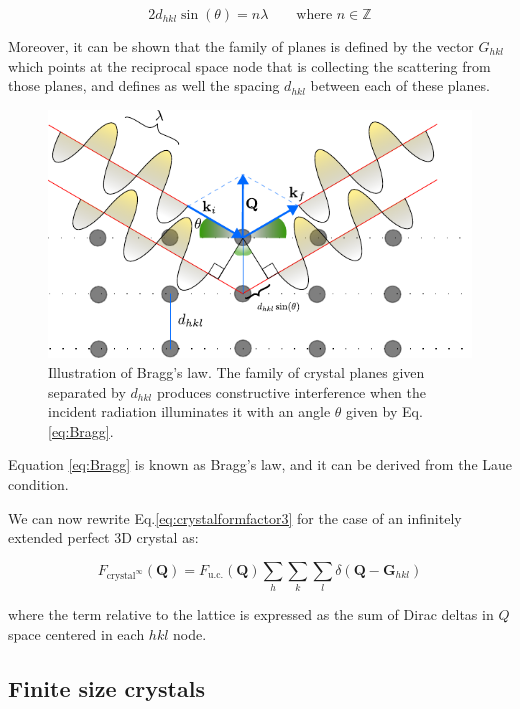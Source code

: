 \begin{equation}
    2 d_{hkl} \sin(\theta) = n \lambda  \qquad \text{where  } n \in \mathbb{Z}
   \label{eq:Bragg}
\end{equation}

Moreover, it can be shown that the family of planes is defined by the vector $G_{hkl}$ which points at the reciprocal space 
node that is collecting the scattering from those planes, and defines as well the spacing $d_{hkl}$ between each of 
these planes. 

\begin{figure}[H]
    \centering
    \includegraphics[width=\textwidth]{figures/Intro/bragg.pdf}
    \caption{Illustration of Bragg's law. The family of crystal planes given separated by $d_{hkl}$ produces constructive interference 
    when the incident radiation illuminates it with an angle  $\theta$ given by Eq.\ref{eq:Bragg}.} 
    \label{fig:bragg}
\end{figure}

Equation \ref{eq:Bragg} is known as Bragg's law, and it can be derived from the Laue condition. 

We can now rewrite Eq.\ref{eq:crystalformfactor3} for the case of an infinitely extended perfect 3D crystal as: 

\begin{equation}
    F_{\text{crystal}^{\infty}}(\mathbf{Q}) = F_{\text{u.c.}}(\mathbf{Q}) 
    \sum_{h} \sum_{k} \sum_{l} 
    \delta\!\left(\mathbf Q - \mathbf{G}_{hkl}\right)
    \label{eq:crystalformfactor4}
\end{equation}
    
where the term relative to the lattice is expressed as the sum of Dirac deltas in $Q$ space centered in each $hkl$ node. 


\subsection{Finite size crystals}

